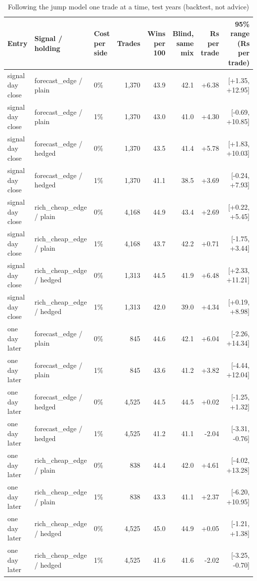 \begin{table}[ht]
\centering
\small
\caption{Following the jump model one trade at a time, test years (backtest, not advice)}
\begin{tabular}{lllrrrrr}
\toprule
Entry & Signal / holding & Cost per side & Trades & Wins per 100 & Blind, same mix & Rs per trade & 95\% range (Rs per trade) \\
\midrule
signal day close & forecast\_edge / plain & 0\% & 1,370 & 43.9 & 42.1 & +6.38 & [+1.35, +12.95] \\
signal day close & forecast\_edge / plain & 1\% & 1,370 & 43.0 & 41.0 & +4.30 & [-0.69, +10.85] \\
signal day close & forecast\_edge / hedged & 0\% & 1,370 & 43.5 & 41.4 & +5.78 & [+1.83, +10.03] \\
signal day close & forecast\_edge / hedged & 1\% & 1,370 & 41.1 & 38.5 & +3.69 & [-0.24, +7.93] \\
signal day close & rich\_cheap\_edge / plain & 0\% & 4,168 & 44.9 & 43.4 & +2.69 & [+0.22, +5.45] \\
signal day close & rich\_cheap\_edge / plain & 1\% & 4,168 & 43.7 & 42.2 & +0.71 & [-1.75, +3.44] \\
signal day close & rich\_cheap\_edge / hedged & 0\% & 1,313 & 44.5 & 41.9 & +6.48 & [+2.33, +11.21] \\
signal day close & rich\_cheap\_edge / hedged & 1\% & 1,313 & 42.0 & 39.0 & +4.34 & [+0.19, +8.98] \\
one day later & forecast\_edge / plain & 0\% & 845 & 44.6 & 42.1 & +6.04 & [-2.26, +14.34] \\
one day later & forecast\_edge / plain & 1\% & 845 & 43.6 & 41.2 & +3.82 & [-4.44, +12.04] \\
one day later & forecast\_edge / hedged & 0\% & 4,525 & 44.5 & 44.5 & +0.02 & [-1.25, +1.32] \\
one day later & forecast\_edge / hedged & 1\% & 4,525 & 41.2 & 41.1 & -2.04 & [-3.31, -0.76] \\
one day later & rich\_cheap\_edge / plain & 0\% & 838 & 44.4 & 42.0 & +4.61 & [-4.02, +13.28] \\
one day later & rich\_cheap\_edge / plain & 1\% & 838 & 43.3 & 41.1 & +2.37 & [-6.20, +10.95] \\
one day later & rich\_cheap\_edge / hedged & 0\% & 4,525 & 45.0 & 44.9 & +0.05 & [-1.21, +1.38] \\
one day later & rich\_cheap\_edge / hedged & 1\% & 4,525 & 41.6 & 41.6 & -2.02 & [-3.25, -0.70] \\
\bottomrule
\end{tabular}
\par{}
\end{table}
